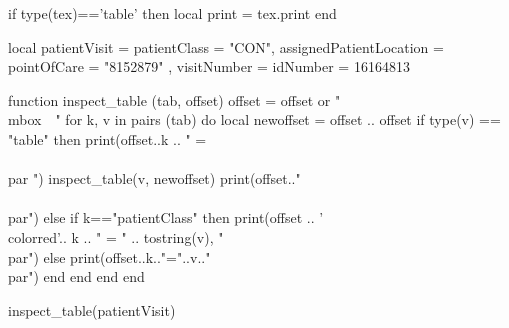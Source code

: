 \documentclass{article}
\begin{document}
\arial

\begin{luacode}
if type(tex)=='table' then local print = tex.print  end
 
local patientVisit = {
    patientClass = "CON",
    assignedPatientLocation = {
        pointOfCare = "8152879"
    },
    visitNumber = {
        idNumber = 16164813
    }
 }

function inspect_table (tab, offset)
    offset = offset or "\\mbox{~~}"
    for k, v in pairs (tab) do
        local newoffset = offset .. offset
        if type(v) == "table" then
           print(offset..k .. " = \\{\\par ")
           inspect_table(v, newoffset)
           print(offset.."\\}\\par")
        else
         if k=="patientClass" then print(offset .. '{\\color{red}'.. k .. "} = " .. tostring(v), "\\par") 
           else
              print(offset..k.."="..v.."\\par")
           end
       end
    end
end

inspect_table(patientVisit)
\end{luacode}
\end{document}
